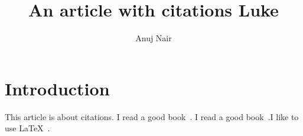 \documentclass{article}
\title{ An article with citations Luke }
\author{Anuj Nair}
\date{}
\begin{document}
\maketitle

\section{Introduction}
This article is about citations. I read a good book~\cite{smith2012}. I read a good book~\cite{hall2013}.I like to use {\LaTeX}~\cite{latex}.
				

\printbibliography
\end{document}

